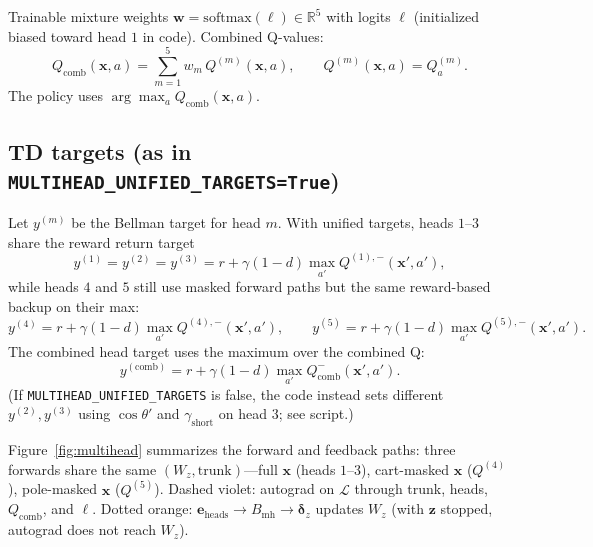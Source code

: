 \documentclass[11pt]{article}
\begin{document}
Trainable mixture weights $\mathbf{w} = \mathrm{softmax}(\boldsymbol{\ell}) \in \mathbb{R}^5$ with logits $\boldsymbol{\ell}$ (initialized biased toward head $1$ in code). Combined Q-values:
\begin{equation}
\label{eq:Qcomb}
Q_{\mathrm{comb}}(\mathbf{x},a) = \sum_{m=1}^{5} w_m\, Q^{(m)}(\mathbf{x},a),
\qquad
Q^{(m)}(\mathbf{x},a) = Q^{(m)}_a.
\end{equation}
The policy uses $\arg\max_a Q_{\mathrm{comb}}(\mathbf{x},a)$.

\subsection{TD targets (as in \texttt{MULTIHEAD\_UNIFIED\_TARGETS=True})}
Let $y^{(m)}$ be the Bellman target for head $m$. With unified targets, heads $1$--$3$ share the reward return target
\begin{equation}
y^{(1)} = y^{(2)} = y^{(3)} = r + \gamma(1-d)\max_{a'} Q^{(1),-}(\mathbf{x}',a'),
\end{equation}
while heads $4$ and $5$ still use masked forward paths but the same reward-based backup on their max:
\begin{equation}
y^{(4)} = r + \gamma(1-d)\max_{a'} Q^{(4),-}(\mathbf{x}',a'),
\qquad
y^{(5)} = r + \gamma(1-d)\max_{a'} Q^{(5),-}(\mathbf{x}',a').
\end{equation}
The combined head target uses the maximum over the combined Q:
\begin{equation}
y^{(\mathrm{comb})} = r + \gamma(1-d)\max_{a'} Q_{\mathrm{comb}}^{-}(\mathbf{x}',a').
\end{equation}
(If \texttt{MULTIHEAD\_UNIFIED\_TARGETS} is false, the code instead sets different $y^{(2)}, y^{(3)}$ using $\cos\theta'$ and $\gamma_{\mathrm{short}}$ on head $3$; see script.)

\medskip\noindent
Figure~\ref{fig:multihead} summarizes the forward and feedback paths: three forwards share the same $(W_z,\mathrm{trunk})$---full $\mathbf{x}$ (heads $1$--$3$), cart-masked $\mathbf{x}$ ($Q^{(4)}$), pole-masked $\mathbf{x}$ ($Q^{(5)}$). \textcolor{violet!85!black}{Dashed violet:} autograd on $\mathcal{L}$ through trunk, heads, $Q_{\mathrm{comb}}$, and $\boldsymbol{\ell}$. \textcolor{orange!90!black}{Dotted orange:} $\mathbf{e}_{\mathrm{heads}}\to B_{\mathrm{mh}}\to\boldsymbol{\delta}_z$ updates $W_z$ (with $\mathbf{z}$ stopped, autograd does not reach $W_z$).
\end{document}
